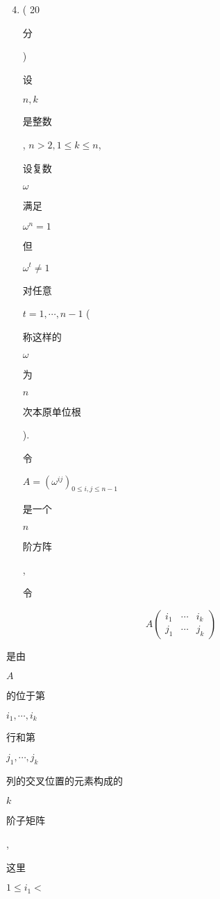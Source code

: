\documentclass[10pt]{article}
\begin{document}
\begin{enumerate}
  \setcounter{enumi}{3}
  \item ( 20 \begin{CJK}{UTF8}{mj}分\end{CJK}) \begin{CJK}{UTF8}{mj}设\end{CJK} $n, k$ \begin{CJK}{UTF8}{mj}是整数\end{CJK}, $n>2,1 \leqslant k \leqslant n$, \begin{CJK}{UTF8}{mj}设复数\end{CJK} $\omega$ \begin{CJK}{UTF8}{mj}满足\end{CJK} $\omega^{n}=1$ \begin{CJK}{UTF8}{mj}但\end{CJK} $\omega^{t} \neq 1$ \begin{CJK}{UTF8}{mj}对任意\end{CJK} $t=1, \cdots, n-1$ (\begin{CJK}{UTF8}{mj}称这样的\end{CJK} $\omega$ \begin{CJK}{UTF8}{mj}为\end{CJK} $n$ \begin{CJK}{UTF8}{mj}次本原单位根\end{CJK}). \begin{CJK}{UTF8}{mj}令\end{CJK} $A=\left(\omega^{i j}\right)_{0 \leqslant i, j \leqslant n-1}$ \begin{CJK}{UTF8}{mj}是一个\end{CJK} $n$ \begin{CJK}{UTF8}{mj}阶方阵\end{CJK}, \begin{CJK}{UTF8}{mj}令\end{CJK}
\end{enumerate}
$$
A\left(\begin{array}{ccc}
i_{1} & \cdots & i_{k} \\
j_{1} & \cdots & j_{k}
\end{array}\right)
$$
\begin{CJK}{UTF8}{mj}是由\end{CJK} $A$ \begin{CJK}{UTF8}{mj}的位于第\end{CJK} $i_{1}, \cdots, i_{k}$ \begin{CJK}{UTF8}{mj}行和第\end{CJK} $j_{1}, \cdots, j_{k}$ \begin{CJK}{UTF8}{mj}列的交叉位置的元素构成的\end{CJK} $k$ \begin{CJK}{UTF8}{mj}阶子矩阵\end{CJK}, \begin{CJK}{UTF8}{mj}这里\end{CJK} $1 \leqslant i_{1}<$
\end{document}
